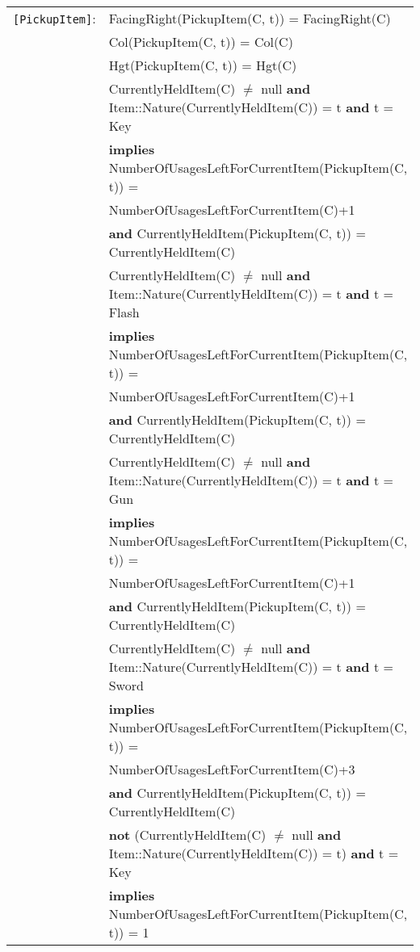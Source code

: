 \documentclass[7pt]{article}
\begin{document}
\begin{tabular}{rl}

\texttt{[PickupItem]}: & FacingRight(PickupItem(C, t)) = FacingRight(C)\\
& Col(PickupItem(C, t)) = Col(C)\\
& Hgt(PickupItem(C, t)) = Hgt(C)\\
& CurrentlyHeldItem(C) $\neq$ null \textbf{and} Item::Nature(CurrentlyHeldItem(C)) = t \textbf{and} t = Key \\
& \quad \textbf{implies} NumberOfUsagesLeftForCurrentItem(PickupItem(C, t)) = \\
& \quad\quad NumberOfUsagesLeftForCurrentItem(C)+1  \\
& \quad\quad \textbf{and} CurrentlyHeldItem(PickupItem(C, t)) = CurrentlyHeldItem(C) \\
& CurrentlyHeldItem(C) $\neq$ null \textbf{and} Item::Nature(CurrentlyHeldItem(C)) = t \textbf{and} t = Flash \\
& \quad \textbf{implies} NumberOfUsagesLeftForCurrentItem(PickupItem(C, t)) = \\
& \quad\quad NumberOfUsagesLeftForCurrentItem(C)+1  \\
& \quad\quad \textbf{and} CurrentlyHeldItem(PickupItem(C, t)) = CurrentlyHeldItem(C) \\
& CurrentlyHeldItem(C) $\neq$ null \textbf{and} Item::Nature(CurrentlyHeldItem(C)) = t \textbf{and} t = Gun \\
& \quad \textbf{implies} NumberOfUsagesLeftForCurrentItem(PickupItem(C, t)) = \\
& \quad\quad NumberOfUsagesLeftForCurrentItem(C)+1  \\
& \quad\quad \textbf{and} CurrentlyHeldItem(PickupItem(C, t)) = CurrentlyHeldItem(C) \\
& CurrentlyHeldItem(C) $\neq$ null \textbf{and} Item::Nature(CurrentlyHeldItem(C)) = t \textbf{and} t = Sword \\
& \quad \textbf{implies} NumberOfUsagesLeftForCurrentItem(PickupItem(C, t)) = \\
& \quad\quad NumberOfUsagesLeftForCurrentItem(C)+3  \\
& \quad\quad \textbf{and} CurrentlyHeldItem(PickupItem(C, t)) = CurrentlyHeldItem(C) \\
& \textbf{not} (CurrentlyHeldItem(C) $\neq$ null \textbf{and} Item::Nature(CurrentlyHeldItem(C)) = t) \textbf{and} t = Key \\
& \quad \textbf{implies} NumberOfUsagesLeftForCurrentItem(PickupItem(C, t)) = 1 \\

\end{tabular}
\end{document}
